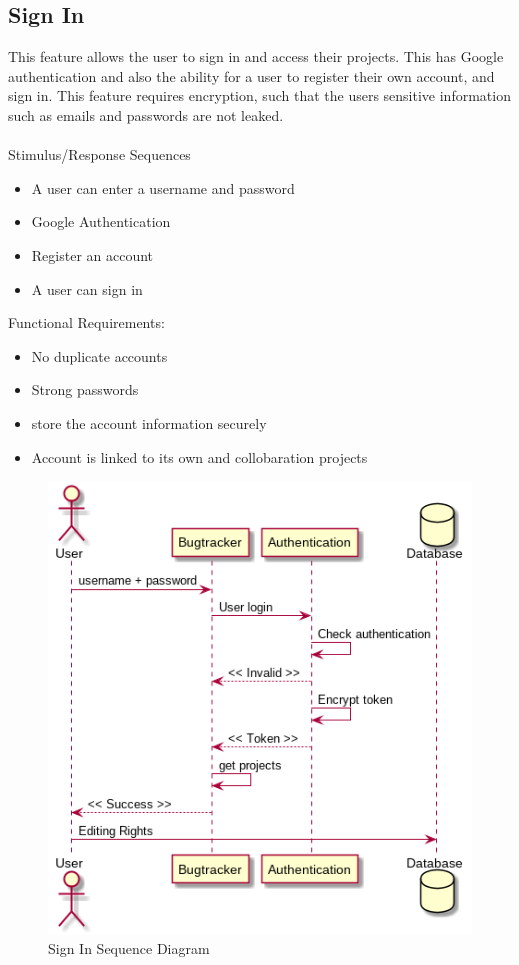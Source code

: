 \documentclass{article}
\begin{document}
\subsection{Sign In}
This feature allows the user to sign in and access their projects. This has Google authentication and also the ability for a user to register their own account, and sign in. This feature requires \gls{encryption}, such that the users sensitive information such as emails and passwords are not leaked.
\\ \\
Stimulus/Response Sequences
\begin{itemize}
\item A user can enter a username and password
\item Google Authentication
\item Register an account
\item A user can sign in
\end{itemize}
Functional Requirements:
\begin{itemize}
\item No duplicate accounts
\item Strong passwords
\item store the account information securely
\item Account is linked to its own and collobaration projects
\end{itemize}
\begin{figure}[H]
\caption{ Sign In Sequence Diagram }
\centering
\includegraphics[width=\textwidth]{sequence-diagram.png}
\end{figure}
\newpage
\end{document}

